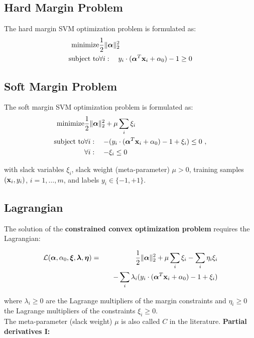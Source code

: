 \subsection{Hard Margin Problem}
  The hard margin SVM optimization problem is formulated as:
  \begin{eqnarray*}
     \mbox{minimize}   & \frac{1}{2} {\|\bm{\mathrm{\alpha}}\|^2_2}\\ 
    \mbox{subject to} & \forall i: \quad y_i\cdot (\bm{\mathrm{\alpha}}^T\bm{\mathrm{x}}_i + \alpha_0) -1 \geq 0
  \end{eqnarray*}

\subsection{Soft Margin Problem}

  The soft margin SVM optimization problem is formulated as:
  \begin{eqnarray*}
    \mbox{minimize}   & \frac{1}{2} {\|\bm{\mathrm{\alpha}}\|^2_2} + \mu \sum_i \xi_i\\
    \mbox{subject to} & \forall i: \quad -(y_i\cdot (\bm{\mathrm{\alpha}}^T\bm{\mathrm{x}}_i + \alpha_0) -1+\xi_i) \leq 0~, \\
    &                    \forall i: \quad -\xi_i \leq 0
  \end{eqnarray*}

  with slack variables $\xi_i$, slack weight (meta-parameter) $\mu>0$, training samples $(\bm{\mathrm{x}}_i, y_i)$, $i=1,\dots,m$, and labels $y_i\in\{-1,+1\}$.

\subsection{Lagrangian}

  The solution of the \textbf{constrained convex optimization problem} requires the Lagrangian:

  \begin{eqnarray*}
    \mathcal L(\bm{\mathrm{\alpha}}, \alpha_0, \bm{\mathrm{\xi}}, \bm{\mathrm{\lambda}}, \bm{\mathrm{\eta}})
     & = & \frac{1}{2} {\|\bm{\mathrm{\alpha}}\|^2_2} + \mu \sum_i \xi_i  -\sum_i \eta_i \xi_i\\
     &   & \quad - \sum_i \lambda_i (y_i\cdot (\bm{\mathrm{\alpha}}^T\bm{\mathrm{x}}_i + \alpha_0) -1+\xi_i)
  \end{eqnarray*}

  where $\lambda_i\geq 0$ are the Lagrange multipliers of the margin constraints and $\eta_i\geq 0$ the Lagrange multipliers of the constraints $\xi_i\geq 0$. \\
  {\normalfont The meta-parameter (slack weight) $\mu$ is also called $C$ in the literature.}
   \textbf{Partial derivatives  I:}
 
